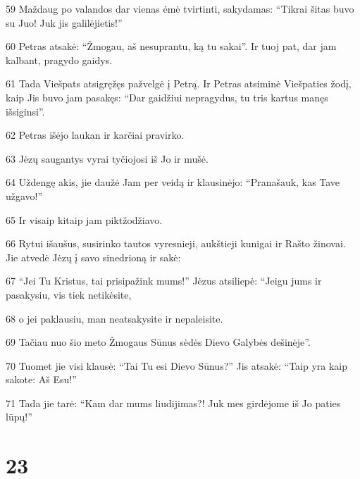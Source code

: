 \par 59 Maždaug po valandos dar vienas ėmė tvirtinti, sakydamas: “Tikrai šitas buvo su Juo! Juk jis galilėjietis!” 
\par 60 Petras atsakė: “Žmogau, aš nesuprantu, ką tu sakai”. Ir tuoj pat, dar jam kalbant, pragydo gaidys. 
\par 61 Tada Viešpats atsigręžęs pažvelgė į Petrą. Ir Petras atsiminė Viešpaties žodį, kaip Jis buvo jam pasakęs: “Dar gaidžiui nepragydus, tu tris kartus manęs išsiginsi”. 
\par 62 Petras išėjo laukan ir karčiai pravirko. 
\par 63 Jėzų saugantys vyrai tyčiojosi iš Jo ir mušė. 
\par 64 Uždengę akis, jie daužė Jam per veidą ir klausinėjo: “Pranašauk, kas Tave užgavo!” 
\par 65 Ir visaip kitaip jam piktžodžiavo. 
\par 66 Rytui išaušus, susirinko tautos vyresnieji, aukštieji kunigai ir Rašto žinovai. Jie atvedė Jėzų į savo sinedrioną ir sakė: 
\par 67 “Jei Tu Kristus, tai prisipažink mums!” Jėzus atsiliepė: “Jeigu jums ir pasakysiu, vis tiek netikėsite, 
\par 68 o jei paklausiu, man neatsakysite ir nepaleisite. 
\par 69 Tačiau nuo šio meto Žmogaus Sūnus sėdės Dievo Galybės dešinėje”. 
\par 70 Tuomet jie visi klausė: “Tai Tu esi Dievo Sūnus?” Jis atsakė: “Taip yra kaip sakote: Aš Esu!” 
\par 71 Tada jie tarė: “Kam dar mums liudijimas?! Juk mes girdėjome iš Jo paties lūpų!”



\chapter{23}


